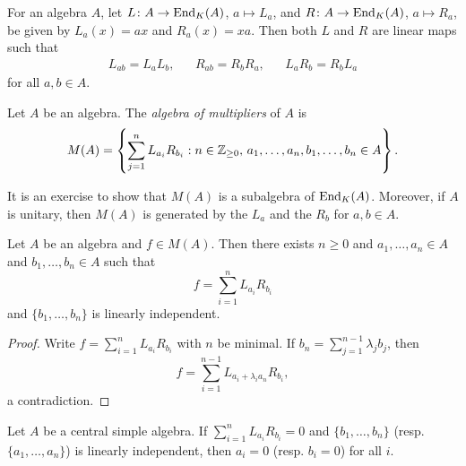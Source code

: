 For an algebra $A$, let $L\colon A\to\operatorname{End}_K(A)$,
$a\mapsto L_a$, and $R\colon A\to\operatorname{End}_K(A)$, $a\mapsto R_a$, be given by 
$L_a(x)=ax$ and $R_a(x)=xa$. Then both $L$ and $R$ are linear maps such that 
\begin{align*}
	L_{ab}=L_aL_b, && R_{ab}=R_bR_a, &&	L_aR_b=R_bL_a
\end{align*}
for all $a,b\in A$.

\begin{definition}
	Let $A$ be an algebra. The \emph{algebra of multipliers} of $A$ 
	is 
	\[
		M(A)=\left\{\sum_{j=1}^n L_{a_i}R_{b_i}:n\in\mathbb{Z}_{\geq0},\,a_1,\dots,a_n,b_1,\dots,b_n\in A\right\}.
	\]
\end{definition}

It is an exercise to show that $M(A)$ is a subalgebra of $\operatorname{End}_K(A)$. Moreover,
if $A$ is unitary, then $M(A)$ is generated by the $L_a$ and the $R_b$ for 
$a,b\in A$.

\begin{lemma}
	\label{lem:SkolemNoether}
	Let $A$ be an algebra and  
	$f\in M(A)$. Then there exists $n\geq0$ and 
	$a_1,\dots,a_n\in A$ and $b_1,\dots,b_n\in A$ such that 
	\[
		f=\sum_{i=1}^n L_{a_i}R_{b_i}
	\]
	and $\{b_1,\dots,b_n\}$ is linearly independent. 
\end{lemma}

\begin{proof}
    Write $f=\sum_{i=1}^n L_{a_i}R_{b_i}$ with $n$ be minimal. If 
    $b_n=\sum_{j=1}^{n-1}\lambda_jb_j$, then
    \[
    f=\sum_{i=1}^{n-1}L_{a_i+\lambda_ia_n}R_{b_i},
    \]
    a contradiction.
\end{proof}

\begin{lemma}
    \label{lem:SkolemNoether1}
    Let $A$ be a central simple algebra. 
    If $\sum_{i=1}^n L_{a_i}R_{b_i}=0$ and $\{b_1,\dots,b_n\}$ 
    (resp. $\{a_1,\dots,a_n\}$) is linearly independent, 
    then $a_i=0$ (resp. $b_i=0$) for all $i$.
\end{lemma}

